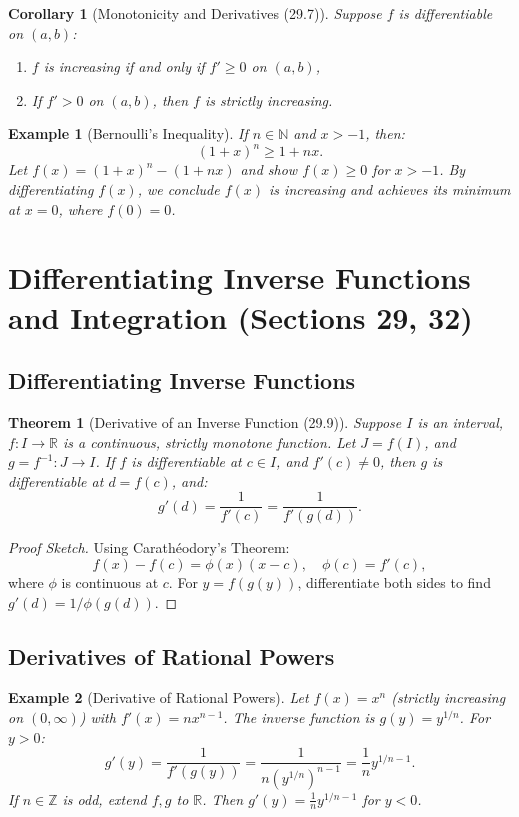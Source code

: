 \documentclass[9pt]{article}
\theoremstyle{definition}
\theoremstyle{plain}
\newtheorem{theorem}{Theorem}
\newtheorem{example}{Example}
\newtheorem{corollary}{Corollary}
\begin{document}
\begin{corollary}[Monotonicity and Derivatives (29.7)]
Suppose \( f \) is differentiable on \( (a, b) \):
\begin{enumerate}
    \item \( f \) is increasing if and only if \( f' \geq 0 \) on \( (a, b) \),
    \item If \( f' > 0 \) on \( (a, b) \), then \( f \) is strictly increasing.
\end{enumerate}
\end{corollary}

\begin{example}[Bernoulli’s Inequality]
If \( n \in \mathbb{N} \) and \( x > -1 \), then:
\[
(1 + x)^n \geq 1 + nx.
\]
Let \( f(x) = (1 + x)^n - (1 + nx) \) and show \( f(x) \geq 0 \) for \( x > -1 \). By differentiating \( f(x) \), we conclude \( f(x) \) is increasing and achieves its minimum at \( x = 0 \), where \( f(0) = 0 \).
\end{example}
\section*{Differentiating Inverse Functions and Integration (Sections 29, 32)}

\subsection*{Differentiating Inverse Functions}
\begin{theorem}[Derivative of an Inverse Function (29.9)]
Suppose \( I \) is an interval, \( f : I \to \mathbb{R} \) is a continuous, strictly monotone function. Let \( J = f(I) \), and \( g = f^{-1} : J \to I \). If \( f \) is differentiable at \( c \in I \), and \( f'(c) \neq 0 \), then \( g \) is differentiable at \( d = f(c) \), and:
\[
g'(d) = \frac{1}{f'(c)} = \frac{1}{f'(g(d))}.
\]
\end{theorem}

\begin{proof}[Proof Sketch]
Using Carathéodory’s Theorem:
\[
f(x) - f(c) = \phi(x)(x - c), \quad \phi(c) = f'(c),
\]
where \( \phi \) is continuous at \( c \). For \( y = f(g(y)) \), differentiate both sides to find \( g'(d) = 1 / \phi(g(d)) \).
\end{proof}

\subsection*{Derivatives of Rational Powers}
\begin{example}[Derivative of Rational Powers]
Let \( f(x) = x^n \) (strictly increasing on \( (0, \infty) \)) with \( f'(x) = nx^{n-1} \). The inverse function is \( g(y) = y^{1/n} \). For \( y > 0 \):
\[
g'(y) = \frac{1}{f'(g(y))} = \frac{1}{n(y^{1/n})^{n-1}} = \frac{1}{n} y^{1/n - 1}.
\]
If \( n \in \mathbb{Z} \) is odd, extend \( f, g \) to \( \mathbb{R} \). Then \( g'(y) = \frac{1}{n} y^{1/n - 1} \) for \( y < 0 \).
\end{example}
\end{document}
